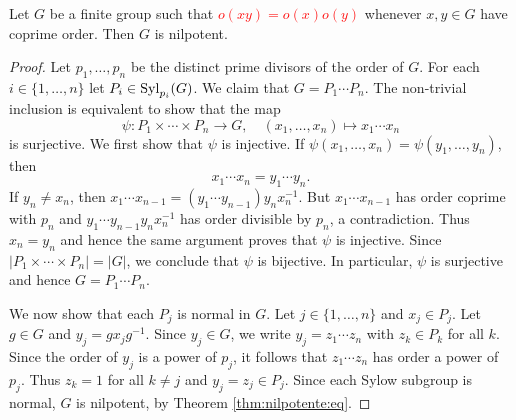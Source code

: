 \begin{theorem}
	Let $G$ be a finite group such that \textcolor{red}{$o(xy)=o(x)o(y)$} whenever $x,y\in G$ have coprime order. Then
	$G$ is nilpotent. 
\end{theorem}

\begin{proof}
	Let $p_1,\dots,p_n$ be the distinct prime divisors of the order of $G$. For each 
	$i\in\{1,\dots,n\}$ let $P_i\in\mathrm{Syl}_{p_i}(G)$. We claim that 
	$G=P_1\cdots P_n$. The non-trivial inclusion is equivalent to show that the map
	\[
		\psi\colon P_1\times\cdots\times P_n\to G,\quad
		(x_1,\dots,x_n)\mapsto x_1\cdots x_n
	\]
	is surjective. We first show that $\psi$ is injective. If 
	$\psi(x_1,\dots,x_n)=\psi(y_1,\dots,y_n)$, then  
	\[
		x_1\cdots
	x_n=y_1\cdots y_n. 
	\]
	If $y_n\ne x_n$, then $x_1\cdots x_{n-1}=(y_1\cdots
	y_{n-1})y_nx_n^{-1}$. But $x_1\cdots x_{n-1}$ has order coprime with 
	$p_n$ and $y_1\cdots y_{n-1}y_nx_n^{-1}$ has order divisible by $p_n$, a contradiction. 
	Thus $x_n=y_n$ and hence the same argument proves that $\psi$ is injective. 
	Since $|P_1\times\cdots\times
	P_n|=|G|$, we conclude that $\psi$ is bijective. In particular, $\psi$ is surjective and hence 
	$G=P_1\cdots P_n$.

	We now show that each $P_j$ is normal in $G$.  Let $j\in\{1,\dots,n\}$ and 
	$x_j\in P_j$. Let $g\in G$ and $y_j=gx_jg^{-1}$.  Since $y_j\in G$,
	we write $y_j=z_1\cdots z_n$ with $z_k\in P_k$ for all $k$. Since the order of 
	$y_j$ is a power of $p_j$, it follows that $z_1\cdots
	z_n$ has order a power of $p_j$. Thus $z_k=1$ for all $k\ne j$ and 
	$y_j=z_j\in P_j$. Since each Sylow subgroup is normal, $G$ is nilpotent, by Theorem \ref{thm:nilpotente:eq}. 
\end{proof}







%
%


